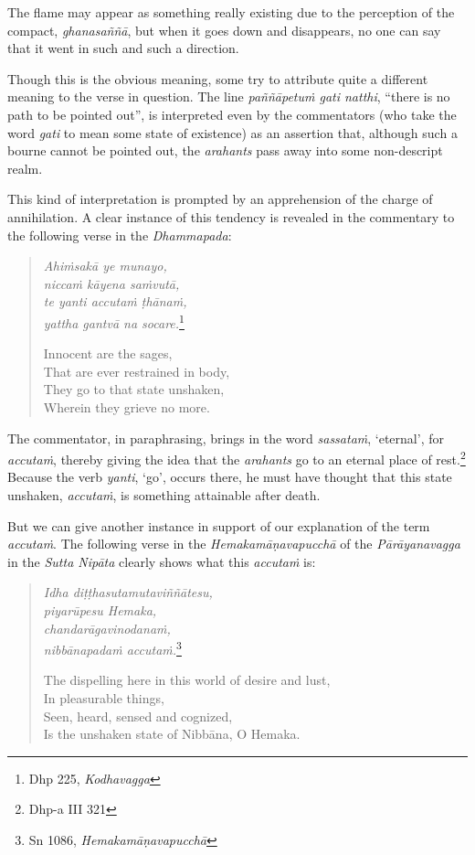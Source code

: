 The flame may appear as something really existing due to the perception of the compact, \emph{ghanasaññā}, but when it goes down and disappears, no one can say that it went in such and such a direction.

Though this is the obvious meaning, some try to attribute quite a different meaning to the verse in question. The line \emph{paññāpetuṁ gati natthi}, ``there is no path to be pointed out'', is interpreted even by the commentators (who take the word \emph{gati} to mean some state of existence) as an assertion that, although such a bourne cannot be pointed out, the \emph{arahants} pass away into some non-descript realm.

This kind of interpretation is prompted by an apprehension of the charge of annihilation. A clear instance of this tendency is revealed in the commentary to the following verse in the \emph{Dhammapada}:

\begin{quote}
\emph{Ahiṁsakā ye munayo,}\\
\emph{niccaṁ kāyena saṁvutā,}\\
\emph{te yanti accutaṁ ṭhānaṁ,}\\
\emph{yattha gantvā na socare.}\footnote{Dhp 225, \emph{Kodhavagga}}

Innocent are the sages,\\
That are ever restrained in body,\\
They go to that state unshaken,\\
Wherein they grieve no more.
\end{quote}

The commentator, in paraphrasing, brings in the word \emph{sassataṁ}, `eternal', for \emph{accutaṁ}, thereby giving the idea that the \emph{arahants} go to an eternal place of rest.\footnote{Dhp-a III 321} Because the verb \emph{yanti}, `go', occurs there, he must have thought that this state unshaken, \emph{accutaṁ}, is something attainable after death.

But we can give another instance in support of our explanation of the term \emph{accutaṁ}. The following verse in the \emph{Hemakamāṇavapucchā} of the \emph{Pārāyanavagga} in the \emph{Sutta Nipāta} clearly shows what this \emph{accutaṁ} is:

\begin{quote}
\emph{Idha diṭṭhasutamutaviññātesu,}\\
\emph{piyarūpesu Hemaka,}\\
\emph{chandarāgavinodanaṁ,}\\
\emph{nibbānapadaṁ accutaṁ.}\footnote{Sn 1086, \emph{Hemakamāṇavapucchā}}

The dispelling here in this world of desire and lust,\\
In pleasurable things,\\
Seen, heard, sensed and cognized,\\
Is the unshaken state of Nibbāna, O Hemaka.
\end{quote}

